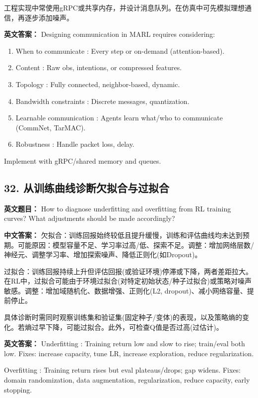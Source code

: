 \documentclass[10pt,a4paper]{ctexart}
\begin{document}
工程实现中常使用gRPC或共享内存，并设计消息队列。在仿真中可先模拟理想通信，再逐步添加噪声。

\textbf{英文答案：}  
Designing communication in MARL requires considering:
\begin{enumerate}
    \item When to communicate : Every step or on-demand (attention-based).
    \item Content : Raw obs, intentions, or compressed features.
    \item Topology : Fully connected, neighbor-based, dynamic.
    \item Bandwidth constraints : Discrete messages, quantization.
    \item Learnable communication : Agents learn what/who to communicate (CommNet, TarMAC).
    \item Robustness : Handle packet loss, delay.
\end{enumerate}

Implement with gRPC/shared memory and queues.

\subsection*{32. 从训练曲线诊断欠拟合与过拟合}
\textbf{英文题目：} How to diagnose underfitting and overfitting from RL training curves? What adjustments should be made accordingly?

\textbf{中文答案：}  
欠拟合：训练回报始终较低且提升缓慢，训练和评估曲线均未达到预期。可能原因：模型容量不足、学习率过高/低、探索不足。调整：增加网络层数/神经元、调整学习率、增加探索噪声、降低正则化(如Dropout)。

过拟合：训练回报持续上升但评估回报(或验证环境)停滞或下降，两者差距拉大。在RL中，过拟合可能由于环境过拟合(对特定初始状态/种子过拟合)或策略对噪声敏感。调整：增加域随机化、数据增强、正则化(L2, dropout)、减小网络容量、提前停止。

具体诊断时需同时观察训练集和验证集(固定种子/变体)的表现，以及策略熵的变化。若熵过早下降，可能过拟合。此外，可检查Q值是否过高(过估计)。

\textbf{英文答案：}  
 Underfitting : Training return low and slow to rise; train/eval both low. Fixes: increase capacity, tune LR, increase exploration, reduce regularization.

 Overfitting : Training return rises but eval plateaus/drops; gap widens. Fixes: domain randomization, data augmentation, regularization, reduce capacity, early stopping.
\end{document}
